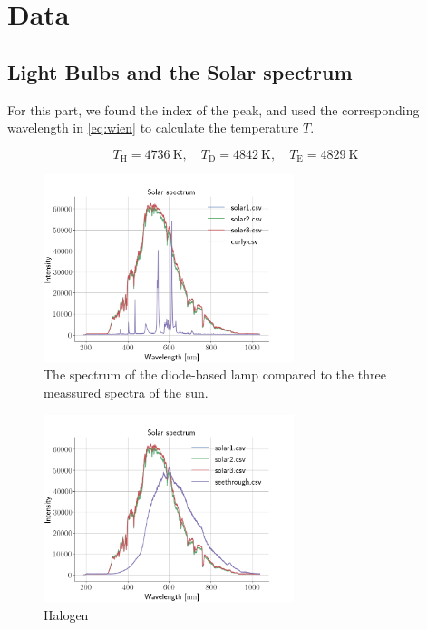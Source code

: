\section{Data}

\subsection{Light Bulbs and the Solar spectrum}
For this part, we found the index of the peak, and used the corresponding
wavelength in \cref{eq:wien} to calculate the temperature $T$.

\begin{equation}
    T_{\text{H}} = \SI{4736}{\kelvin}, \quad T_{\text{D}} =
    \SI{4842}{\kelvin}, \quad T_{\text{E}} = \SI{4829}{\kelvin}
\end{equation}

\begin{figure}[h!]
\centering
\includegraphics[width=0.65\textwidth]{SolarComparison0}
\caption{The spectrum of the diode-based lamp compared to the three meassured spectra of
the sun.} 
\label{diode}
\end{figure}

\begin{figure}[h!]
\centering
\includegraphics[width=0.65\textwidth]{SolarComparison1}
\caption{Halogen}
\label{halogen}
\end{figure}

